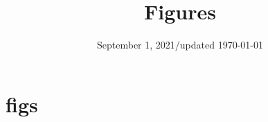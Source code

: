 \documentclass[letterpaper]{article}
\begin{document}
\title{Figures}
\vspace{5pt}

\date{September 1, 2021/updated \today}

\maketitle

\vspace{-5pt}
 

\section*{figs}


\end{document}
